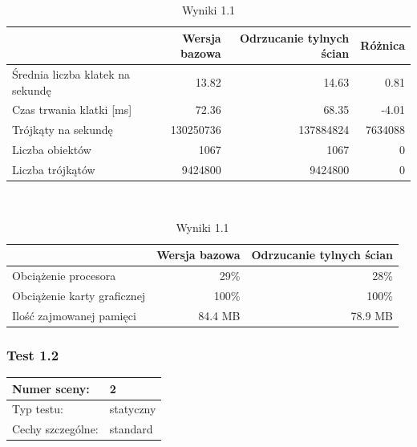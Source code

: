 \documentclass[a4paper,twoside,12pt]{book}
\begin{document}
\begin{table}[H]
    \centering
    \caption{Wyniki 1.1}
    \label{tab:backface_test1}
    \begin{tabular}{|l||r|r|r|}
        \hline
        & Wersja bazowa & Odrzucanie tylnych ścian & Różnica \\
        \hline
        Średnia liczba klatek na sekundę & 13.82 & 14.63 & 0.81 \\
        \hline
        Czas trwania klatki [ms] & 72.36 & 68.35 & -4.01 \\
        \hline
        Trójkąty na sekundę & 130250736 & 137884824 & 7634088 \\
        \hline
        Liczba obiektów & 1067 & 1067 & 0 \\
        \hline
        Liczba trójkątów & 9424800 & 9424800 & 0 \\
        \hline
    \end{tabular} \\
    
    \vspace*{0.5 cm}
    
    \begin{tabular}{|l||r|r|}
        \hline
        & Wersja bazowa & Odrzucanie tylnych ścian \\
         \hline
        Obciążenie procesora & 29\% & 28\% \\
        \hline
        Obciążenie karty graficznej & 100\% & 100\% \\
        \hline
        Ilość zajmowanej pamięci & 84.4 MB & 78.9 MB \\
        \hline
    \end{tabular}
\end{table}

\newpage

\subsubsection{Test 1.2}
\begin{tabular}{|l||l|}
\hline
Numer sceny: & 2 \\
\hline
Typ testu: & statyczny \\
\hline
Cechy szczególne: & standard \\
\hline
\end{tabular}\\

\vbox{}
\end{document}
